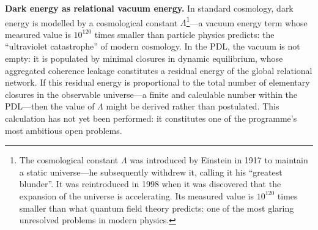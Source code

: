 \documentclass[12pt, a4paper, openright]{book}
\begin{document}
\medskip

\textbf{Dark energy as relational vacuum energy.} In standard cosmology, dark energy is modelled by a cosmological constant $\Lambda$\footnote{The cosmological constant $\Lambda$ was introduced by Einstein in 1917 to maintain a static universe---he subsequently withdrew it, calling it his ``greatest blunder''. It was reintroduced in 1998 when it was discovered that the expansion of the universe is accelerating. Its measured value is $10^{120}$ times smaller than what quantum field theory predicts: one of the most glaring unresolved problems in modern physics.}---a vacuum energy term whose measured value is $10^{120}$ times smaller than particle physics predicts: the ``ultraviolet catastrophe'' of modern cosmology. In the PDL, the vacuum is not empty: it is populated by minimal closures in dynamic equilibrium, whose aggregated coherence leakage constitutes a residual energy of the global relational network. If this residual energy is proportional to the total number of elementary closures in the observable universe---a finite and calculable number within the PDL---then the value of $\Lambda$ might be derived rather than postulated. This calculation has not yet been performed: it constitutes one of the programme's most ambitious open problems.

\medskip
\end{document}
